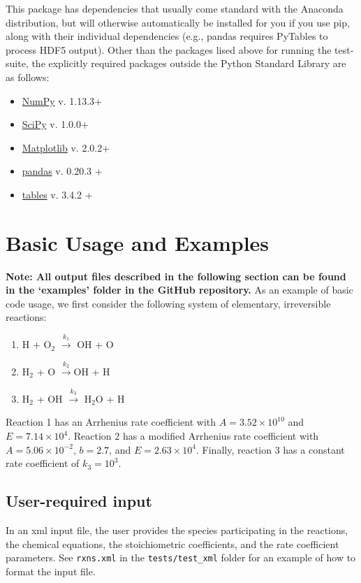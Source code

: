 \documentclass[12pt]{article}
\begin{document}
This package has dependencies that usually come standard with the Anaconda distribution, but will otherwise automatically be installed for you if you use pip, along with their individual dependencies (e.g., pandas requires PyTables to process HDF5 output). Other than the packages lised above for running the test-suite, the explicitly required packages outside the Python Standard Library are as follows: 
\begin{itemize}
\item \href{http://www.numpy.org/}{NumPy} v. 1.13.3+
\item \href{https://www.scipy.org/}{SciPy} v. 1.0.0+
\item \href{https://pandas.pydata.org/} {Matplotlib} v. 2.0.2+
\item \href{https://matplotlib.org/api/pyplot_api.html} {pandas} v. 0.20.3 +
\item
\href{http://www.pytables.org} {tables} v. 3.4.2 +
\end{itemize}

\section{Basic Usage and Examples}
\textbf{Note: All output files described in the following section can be found in the `examples' folder in the GitHub repository.}
As an example of basic code usage, we first consider the following system of elementary, irreversible reactions:

\begin{enumerate}
\item H + O$_2$ $\overset{k_1}{\rightarrow}$ OH + O
\item H$_2$ + O $\overset{k_2}{\rightarrow}$OH + H
\item H$_2$ + OH $\overset{k_3}{\rightarrow}$ H$_2$O + H
\end{enumerate}

Reaction 1 has an Arrhenius rate coefficient with $A = 3.52\times 10^{10}$ and $E = 7.14\times 10^4$. Reaction 2 has a modified Arrhenius rate coefficient with $A = 5.06\times 10^{-2}$, $b = 2.7$, and $E = 2.63\times10^4$. Finally, reaction 3 has a constant rate coefficient of $k_3 = 10^3$.



\subsection{User-required input}
In an xml input file, the user provides the species participating in the reactions, the chemical equations, the stoichiometric coefficients, and the rate coefficient parameters. See {\tt rxns.xml} in the {\tt tests/test\_xml} folder for an example of how to format the input file. 
\end{document}
